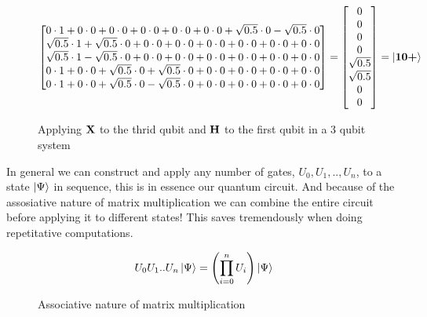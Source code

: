 \begin{figure}[H]
\begin{align*}
\begin{bmatrix}
            0           \cdot 1 +  0          \cdot 0 +   0          \cdot 0 +   0          \cdot 0 +   0               \cdot 0 +          0          \cdot 0 +   \sqrt{0.5} \cdot 0    -\sqrt{0.5}\cdot 0\\
            \sqrt{0.5}  \cdot 1 +  \sqrt{0.5} \cdot 0 +   0          \cdot 0 +   0          \cdot 0 +   0               \cdot 0 +          0          \cdot 0 +   0          \cdot 0 +   0         \cdot 0\\
            \sqrt{0.5}  \cdot 1   -\sqrt{0.5} \cdot 0 +   0          \cdot 0 +   0          \cdot 0 +   0               \cdot 0 +          0          \cdot 0 +   0          \cdot 0 +   0         \cdot 0\\
            0           \cdot 1 +  0          \cdot 0 +   \sqrt{0.5} \cdot 0 +   \sqrt{0.5} \cdot 0 +   0               \cdot 0 +          0          \cdot 0 +   0          \cdot 0 +   0         \cdot 0\\
            0           \cdot 1 +  0          \cdot 0 +   \sqrt{0.5} \cdot 0    -\sqrt{0.5} \cdot 0 +   0               \cdot 0 +          0          \cdot 0 +   0          \cdot 0 +   0         \cdot 0\\
        \end{bmatrix}
        =
        \begin{bmatrix}
            0\\
            0\\
            0\\
            0\\
            \sqrt{0.5}\\
            \sqrt{0.5}\\
            0\\
            0
        \end{bmatrix}
        &=
        \ket{\mathbf{1}\mathbf{0}\textbf{+}}
    \end{align*}
    \caption{Applying $\mathbf{X}$ to the thrid qubit and $\mathbf{H}$ to the first qubit in a 3 qubit system}
    \label{fig:applying_multiple_gates}
\end{figure}
\noindent
In general we can construct and apply any number of gates, $U_0,U_1,..,U_n$, to a state $\ket{\Psi}$ in sequence, this is in essence our quantum circuit. 
And because of the assosiative nature of matrix multiplication we can combine the entire circuit before applying it to different states! 
This saves tremendously when doing repetitative computations.
\begin{figure}[H]
    \centering
    \begin{gather*}
        U_0 U_1 .. U_n \ket{\Psi} = \left(\prod_{i=0}^n U_i\right) \ket{\Psi}\\
    \end{gather*}
    \caption{Associative nature of matrix multiplication}
    \label{fig:assosiative}
\end{figure}

